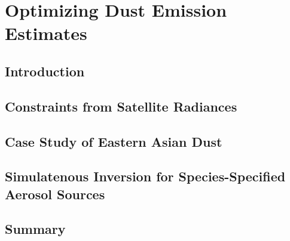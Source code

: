 \chapter{Optimizing Dust Emission Estimates} \label{chap:optems}

\section{Introduction}

\section{Constraints from Satellite Radiances}

\section{Case Study of Eastern Asian Dust}

\section{Simulatenous Inversion for Species-Specified Aerosol Sources}

\section{Summary}
